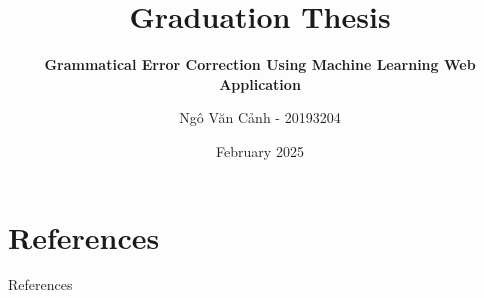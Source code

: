 \documentclass[aspectratio=169]{beamer}
\title{Graduation Thesis}
\subtitle{\textbf{Grammatical Error Correction Using Machine Learning Web Application}}
\author{Ngô Văn Cảnh - 20193204}
\date{February 2025}
\begin{document}
\begin{frame}
  \maketitle
\end{frame}






\section{References}
\begin{frame}{References}
  
  
\end{frame}

\begin{frame}{~}
  \begin{center}
    \Large \color{hustred}{Thank you for your attention!}
  \end{center}
\end{frame}
\end{document}
